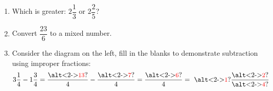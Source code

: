 \documentclass{beamer}
\newcommand{\ashow}[1]{\uncover<2->{\textcolor{red}{\small #1}}}
\newcommand{\ashowq}[1]{\alt<2->{\textcolor{red}{\small #1}}{?}}
\begin{document}
\begin{frame}
\begin{columns}
\begin{enumerate}
  \item Which is greater: $2\dfrac{1}{3}$ or $2\dfrac{2}{5}$? \ashow{$2\frac{2}{5}$}
  \item Convert $\dfrac{23}{6}$ to a mixed number. \ashow{$=3\frac{5}{6}$}
  \item Consider the diagram on the left, fill in the blanks to demonstrate subtraction using improper fractions:
  \[
    3\frac{1}{4} - 1\frac{3}{4} = \frac{\text{{\ashowq{13}}}}{4} - \frac{\text{{\ashowq{7}}}}{4} = \frac{\text{{\ashowq{6}}}}{4} = \ \text{{\ashowq{1}}} \frac{\text{{\ashowq{2}}}}{\text{{\ashowq{4}}}}
  \]
  
\end{enumerate}

\end{columns}
\end{frame}
\end{document}
